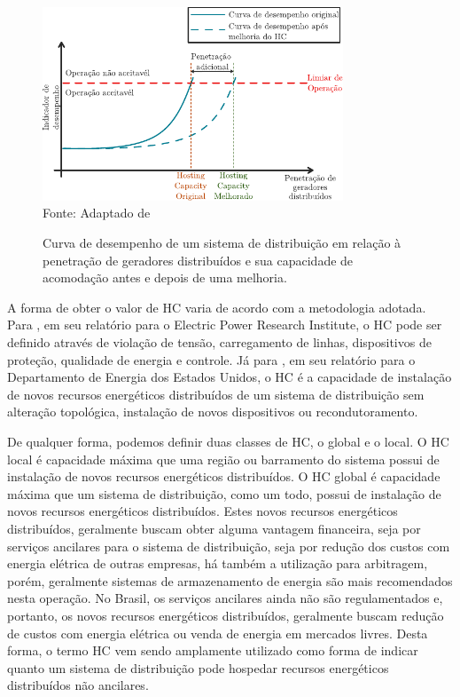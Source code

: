 \begin{figure}[ht]
 	\centering
    \caption{Curva de desempenho de um sistema de distribuição em relação à penetração de geradores distribuídos e sua capacidade de acomodação antes e depois de uma melhoria.}
    \includegraphics[width=0.8\textwidth]{cap3/HC.pdf}\\
    Fonte: Adaptado de 
    \label{fig:hc}
\end{figure}

A forma de obter o valor de \ac{HC} varia de acordo com a metodologia adotada. Para , em seu relatório para o Electric Power Research Institute, o \ac{HC} pode ser definido através de violação de tensão, carregamento de linhas, dispositivos de proteção, qualidade de energia e controle. Já para , em seu relatório para o Departamento de Energia dos Estados Unidos, o \ac{HC} é a capacidade de instalação de novos recursos energéticos distribuídos de um sistema de distribuição sem alteração topológica, instalação de novos dispositivos ou recondutoramento. 


De qualquer forma, podemos definir duas classes de \ac{HC}, o global e o local. O \ac{HC} local é capacidade máxima que uma região ou barramento do sistema possui de instalação de novos recursos energéticos distribuídos. O \ac{HC} global é capacidade máxima que um sistema de distribuição, como um todo, possui de instalação de novos recursos energéticos distribuídos. 
Estes novos recursos energéticos distribuídos, geralmente buscam obter alguma vantagem financeira, seja por serviços ancilares para o sistema de distribuição, seja por redução dos custos com energia elétrica de outras empresas, há também a utilização para arbitragem, porém, geralmente sistemas de armazenamento de energia são mais recomendados nesta operação.
No Brasil, os serviços ancilares ainda não são regulamentados e, portanto, os novos recursos energéticos distribuídos, geralmente buscam redução de custos com energia elétrica ou venda de energia em mercados livres.
Desta forma, o termo \ac{HC} vem sendo amplamente utilizado como forma de indicar quanto um sistema de distribuição pode hospedar recursos energéticos distribuídos não ancilares.

